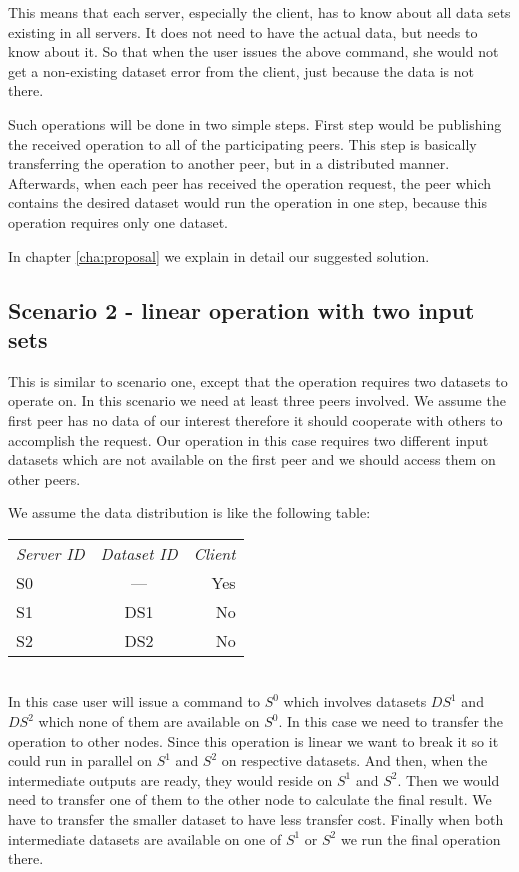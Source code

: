 This means that each server, especially the client, has to know about all data sets existing in all servers.
It does not need to have the actual data, but needs to know about it. 
So that when the user issues the above command,
she would not get a non-existing dataset error from the client, just because the data is not there. 

Such operations will be done in two simple steps. 
First step would be publishing the received operation to all of the participating peers.
This step is basically transferring the operation to another peer, but in a distributed manner.
Afterwards, when each peer has received the operation request, 
the peer which contains the desired dataset would run the operation in one step,
because this operation requires only one dataset.

In chapter \ref{cha:proposal} we explain in detail our suggested solution.

\subsection{Scenario 2 - linear operation with two input sets}
\label{sc:sc2}
This is similar to scenario one, except that the operation requires two datasets to operate on. 
In this scenario we need at least three peers involved. We assume the first peer has no
data of our interest therefore it should cooperate with others to accomplish the request. 
Our operation in this case requires two 
different input datasets which are not available on the first peer and we should access them on other peers. 

We assume the data distribution is like the following table:\\

\begin{tabular}{ l c r }
\em{Server ID} & \em{ Dataset ID} & \em{ Client} \\
S0 & --- & Yes \\
S1 & DS1 & No \\
S2 & DS2 & No \\
\end{tabular}\\

In this case user will issue a command to \(S^0\) which involves datasets \(DS^1\) and \(DS^2\) 
which none of them are available on \(S^0\).
In this case we need to transfer the operation to other nodes. 
Since this operation is linear we want to break it so it could run in parallel on \(S^1\) and \(S^2\) on
respective datasets.
And then, when the intermediate outputs are ready, they would reside on \(S^1\) and \(S^2\).
Then we would need to transfer one of them to the other node to calculate the final result.
We have to transfer the smaller dataset to have less transfer cost.
Finally when both intermediate datasets are available on one of \(S^1\) or \(S^2\) we run the final operation there.

